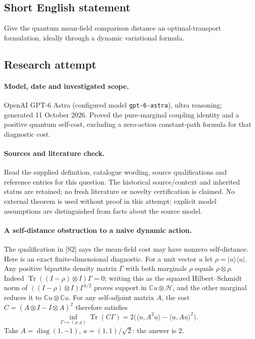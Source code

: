 \documentclass[11pt]{article}
\begin{document}
\subsection{Short English statement}
Give the quantum mean-field comparison distance an optimal-transport formulation, ideally through a dynamic variational formula.
\subsection{Research attempt}
\paragraph{Model, date and investigated scope.}
OpenAI GPT-6 Astra (configured model \texttt{gpt-6-astra}), ultra reasoning; generated 11 October 2026. Proved the pure-marginal coupling identity and a positive quantum self-cost, excluding a zero-action constant-path formula for that diagnostic cost.

\paragraph{Sources and literature check.}
Read the supplied definition, catalogue wording, source qualifications and reference entries for this question. The historical source/context and inherited status are retained; no fresh literature or novelty certification is claimed. No external theorem is used without proof in this attempt; explicit model assumptions are distinguished from facts about the source model.

\paragraph{A self-distance obstruction to a naive dynamic action.} The qualification in [S2] says the mean-field cost may have nonzero self-distance. Here is an exact finite-dimensional diagnostic. For a unit vector \(u\) let \(\rho=|u\rangle\langle u|\). Any positive bipartite density matrix \(\Gamma\) with both marginals \(\rho\) equals \(\rho\otimes\rho\). Indeed \(\operatorname{Tr}((I-\rho)\otimes I)\Gamma=0\); writing this as the squared Hilbert--Schmidt norm of \(((I-\rho)\otimes I)\Gamma^{1/2}\) proves support in \(\mathbb Cu\otimes\mathcal H\), and the other marginal reduces it to \(\mathbb Cu\otimes\mathbb Cu\).
For any self-adjoint matrix \(A\), the cost \(C=(A\otimes I-I\otimes A)^2\) therefore satisfies
\[
 \inf_{\Gamma\mapsto(\rho,\rho)}\operatorname{Tr}(C\Gamma)
 =2\big(\langle u,A^2u\rangle-\langle u,Au\rangle^2\big).
\]
Take \(A=\operatorname{diag}(1,-1)\), \(u=(1,1)/\sqrt2\): the answer is \(2\).
\end{document}
